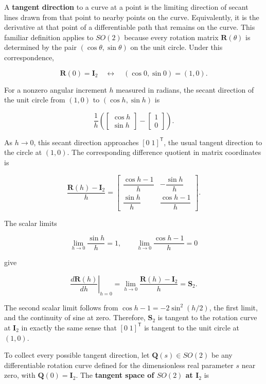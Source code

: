 \documentclass[
  australian,
  12pt,
  letterpaper,
  DIV=11,
  numbers=noendperiod,
  twoside]{scrreprt}
\begin{document}
A \textbf{tangent direction} to a curve at a point is the limiting
direction of secant lines drawn from that point to nearby points on the
curve. Equivalently, it is the derivative at that point of a
differentiable path that remains on the curve. This familiar definition
applies to \(SO(2)\) because every rotation matrix \(\mathbf R(\theta)\)
is determined by the pair \((\cos\theta,\sin\theta)\) on the unit
circle. Under this correspondence,

\[
\mathbf R(0)=\mathbf I_2
\quad\longleftrightarrow\quad
(\cos0,\sin0)=(1,0).
\]

For a nonzero angular increment \(h\) measured in radians, the secant
direction of the unit circle from \((1,0)\) to \((\cos h,\sin h)\) is

\[
\frac{1}{h}
\left(
\begin{bmatrix}
\cos h\\
\sin h
\end{bmatrix}
-
\begin{bmatrix}
1\\0
\end{bmatrix}
\right).
\]

As \(h\to0\), this secant direction approaches \([0\;1]^\mathsf T\), the
usual tangent direction to the circle at \((1,0)\). The corresponding
difference quotient in matrix coordinates is

\[
\frac{\mathbf R(h)-\mathbf I_2}{h}
=
\begin{bmatrix}
\dfrac{\cos h-1}{h}&-\dfrac{\sin h}{h}\\[6pt]
\dfrac{\sin h}{h}&\dfrac{\cos h-1}{h}
\end{bmatrix}.
\]

The scalar limits

\[
\lim_{h\to0}\frac{\sin h}{h}=1,
\qquad
\lim_{h\to0}\frac{\cos h-1}{h}=0
\]

give

\[
\boxed{
\left.
\frac{d\mathbf R(h)}{dh}
\right|_{h=0}
=
\lim_{h\to0}
\frac{\mathbf R(h)-\mathbf I_2}{h}
=
\mathbf S_2
}.
\]

The second scalar limit follows from \(\cos h-1=-2\sin^2(h/2)\), the
first limit, and the continuity of sine at zero. Therefore,
\(\mathbf S_2\) is tangent to the rotation curve at \(\mathbf I_2\) in
exactly the same sense that \([0\;1]^\mathsf T\) is tangent to the unit
circle at \((1,0)\).

To collect every possible tangent direction, let
\(\mathbf Q(s)\in SO(2)\) be any differentiable rotation curve defined
for the dimensionless real parameter \(s\) near zero, with
\(\mathbf Q(0)=\mathbf I_2\). The \textbf{tangent space of \(SO(2)\) at
\(\mathbf I_2\)} is
\end{document}
